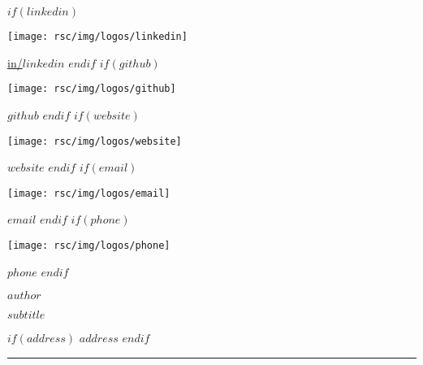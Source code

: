 \documentclass[
$if(fontsize)$
    $fontsize$,
$endif$
$if(lang)$
    $babel-lang$,
$endif$
$if(papersize)$
    $papersize$paper,
$endif$
$for(classoption)$
    $classoption$$sep$,
$endfor$
]{$documentclass$}
\newcommand{\HRule}{\noindent\rule{\linewidth}{0.1mm}}
\begin{document}
\vspace*{-2cm}
\begin{multicols}{3}
\begin{flushleft}
    \scriptsize
    \vspace*{\fill}
    $if(linkedin)$
        \begin{minipage}{0.8\baselineskip}
            \texttt{[image: rsc/img/logos/linkedin]}
        \end{minipage}
        \href{https://www.linkedin.com/in/$linkedin$}{in/$linkedin$}
        \linebreak
    $endif$
    $if(github)$
        \begin{minipage}{0.8\baselineskip}
            \texttt{[image: rsc/img/logos/github]}
        \end{minipage}
        \href{https://github.com/$github$}{$github$}
        \linebreak
    $endif$
    $if(website)$
        \begin{minipage}{0.8\baselineskip}
            \texttt{[image: rsc/img/logos/website]}
        \end{minipage}
        \href{https://$website$}{$website$}
        \linebreak
    $endif$
    $if(email)$
        \begin{minipage}{0.8\baselineskip}
            \texttt{[image: rsc/img/logos/email]}
        \end{minipage}
        \href{mailto:$email$?subject=Heyy!&body=What can I do for you? :)}{$email$}
        \linebreak
    $endif$
    $if(phone)$
        \begin{minipage}{0.8\baselineskip}
            \texttt{[image: rsc/img/logos/phone]}
        \end{minipage}
        $phone$
    $endif$
\end{flushleft}
\columnbreak

\begin{center}
    \huge
    \vspace*{\fill}
    \textbf{$author$}
    \vspace{0.1cm}

    \scriptsize
    $subtitle$
\end{center}
\columnbreak

\begin{flushright}
    \scriptsize
    \vspace*{\fill}
    $if(address)$
        $address$
    $endif$
\end{flushright}
\end{multicols}
\vspace{-0.3cm}
\HRule
\vspace{0cm}
\thispagestyle{fancy}
\end{document}
